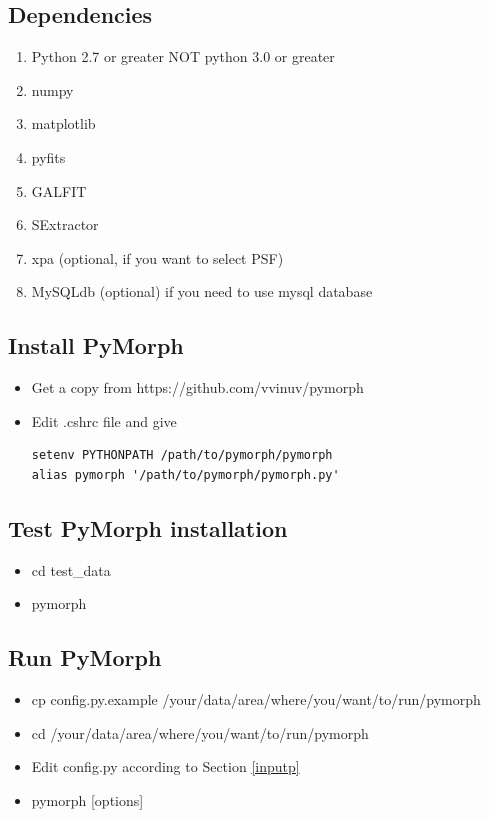 \documentclass[a4paper,10pt]{article}
\begin{document}
\subsection{Dependencies}
\begin{enumerate}
 \item Python 2.7 or greater NOT python 3.0 or greater
 \item numpy
 \item matplotlib
 \item pyfits
 \item GALFIT
 \item SExtractor
 \item xpa (optional, if you want to select PSF)
 \item MySQLdb (optional) if you need to use mysql database
\end{enumerate}

\subsection{Install PyMorph}
\begin{itemize}
\item Get a copy from https://github.com/vvinuv/pymorph
\item Edit .cshrc file and give
\begin{footnotesize}
\begin{verbatim}
setenv PYTHONPATH /path/to/pymorph/pymorph
alias pymorph '/path/to/pymorph/pymorph.py'
\end{verbatim}
\end{footnotesize}
\end{itemize}

\subsection{Test PyMorph installation}
\begin{itemize}
\item cd test\_data
\item pymorph
\end{itemize}

\subsection{Run PyMorph}
\begin{itemize}
\item cp config.py.example /your/data/area/where/you/want/to/run/pymorph
\item cd /your/data/area/where/you/want/to/run/pymorph
\item Edit config.py according to Section \ref{inputp} 
\item pymorph [options]
\end{itemize}
\end{document}
